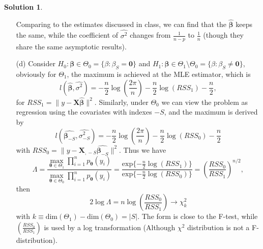 \documentclass[11pt,letterpaper,english,oneside]{article} %
\theoremstyle{definition} %
\newtheorem{solution}{Solution}
\newenvironment{sol}{\begin{solution}\hspace{0pt}}{\end{solution}}
\begin{document}
\begin{sol}
\begin{itemize}
    Comparing to the estimates discussed in class, we can find that the $\hat{\bm \beta}$ keeps the same, while the coefficient of $\widehat{\sigma^2}$ changes from $\frac{1}{n-p}$ to $\frac{1}{n}$ (though they share the same asymptotic results).

    \item[(d)] Consider $H_0: \bm \beta \in \Theta_0 =  \{ \beta: \beta_S = \bm 0\}$ and $H_1 : \bm \beta \in \Theta_1 \setminus \Theta_0 = \{ \beta: \beta_S \neq \bm 0\} $, obviously for $\Theta_1$, the maximum is achieved at the MLE estimator, which is 
    $$
        l(\hat{\bm \beta}, \widehat{\sigma^2}) = -\frac{n}{2}\log(\frac{2 \pi}{n}) - \frac{n}{2}\log(RSS_1) - \frac{n}{2},
    $$
    for $RSS_1 = \|y - \bm X\hat{\bm \beta}\|^2$. Similarly, under $\Theta_0$ we can view the problem as regression using the covariates with indexes $-S$, and the maximum is derived by
    $$
        l(\hat{\bm \beta_{-S}}, \widehat{\sigma_{-S}^2}) = -\frac{n}{2}\log(\frac{2 \pi}{n}) - \frac{n}{2}\log(RSS_0) - \frac{n}{2}
    $$
    with $RSS_0 = \|y - \bm X_{\dot,-S}\hat{\bm \beta_{-S}}\|^2$.
    Thus we have
    $$
    \Lambda = \frac{\max_{\bm \theta \in \Theta_1}\prod_{i = 1}^n p_{\bm \theta}(y_i)}{\max_{\bm \theta \in \Theta_0}\prod_{i = 1}^n p_{\bm \theta}(y_i)} = \frac{\text{exp}\{-\frac{n}{2}\log(RSS_1)\}}{\text{exp}\{-\frac{n}{2}\log(RSS_0)\}} = \left(\frac{RSS_0}{RSS_1}\right)^{n/2},
    $$
    then $$2\log \Lambda = n \log \left(\frac{RSS_0}{RSS_1}\right) \rightarrow \chi_k^2$$ with $k \equiv \text{dim}(\Theta_1) - \text{dim}(\Theta_0) = |S|$. The form is close to the F-test, while $\left(\frac{RSS_0}{RSS_1}\right)$ is used by a log transformation (Although $\chi^2$ distribution is not a F-distribution).
    \end{itemize}
    
    \end{sol}
    
\end{document}
